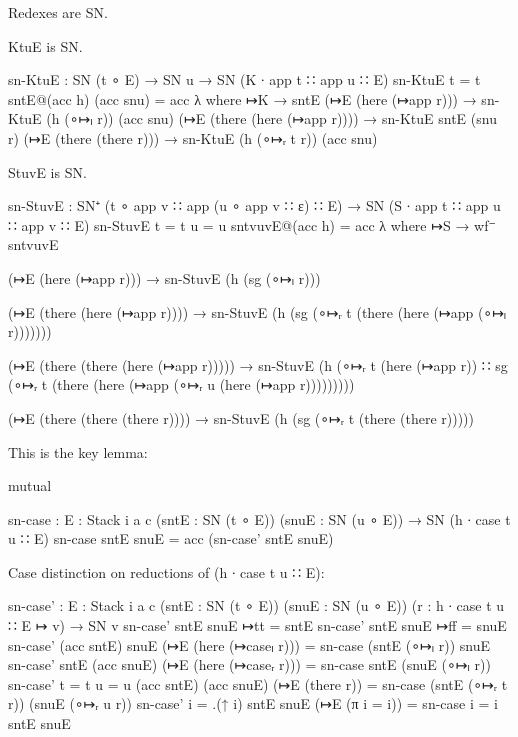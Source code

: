 Redexes are SN.

KtuE is SN.

\begin{code}
sn-KtuE : SN (t ∘ E) → SN u → SN (K ∙ app t ∷ app u ∷ E)
sn-KtuE {t = t} sntE@(acc h) (acc snu)  = acc λ where
   ↦K                            → sntE
   (↦E (here (↦app r)))          → sn-KtuE (h (∘↦ₗ r))    (acc snu)
   (↦E (there (here (↦app r))))  → sn-KtuE sntE           (snu r)
   (↦E (there (there r)))        → sn-KtuE (h (∘↦ᵣ t r))  (acc snu)
\end{code}

StuvE is SN.

\begin{code}
sn-StuvE : SN⁺ (t ∘ app v ∷ app (u ∘ app v ∷ ε) ∷ E)
          → SN (S ∙ app t ∷ app u ∷ app v ∷ E)
sn-StuvE {t = t} {u = u} sntvuvE@(acc h) = acc λ where
  ↦S →
    wf⁻ sntvuvE

  (↦E (here (↦app r))) →
    sn-StuvE (h (sg (∘↦ₗ r)))

  (↦E (there (here (↦app r)))) →
    sn-StuvE (h (sg (∘↦ᵣ t (there (here (↦app (∘↦ₗ r)))))))

  (↦E (there (there (here (↦app r))))) →
    sn-StuvE (h (∘↦ᵣ t (here (↦app r)) ∷
                 sg (∘↦ᵣ t (there (here (↦app (∘↦ᵣ u (here (↦app r)))))))))

  (↦E (there (there (there r)))) →
    sn-StuvE (h (sg (∘↦ᵣ t (there (there r)))))
\end{code}

This is the key lemma:

\begin{code}
mutual

  sn-case : {E : Stack i a c} (sntE : SN (t ∘ E)) (snuE : SN (u ∘ E)) → SN (h ∙ case t u ∷ E)
  sn-case sntE snuE = acc (sn-case' sntE snuE)
\end{code}

  Case distinction on reductions of (h ∙ case t u ∷ E):

\begin{code}
  sn-case' : {E : Stack i a c}
            (sntE : SN (t ∘ E))
            (snuE : SN (u ∘ E))
            (r : h ∙ case t u ∷ E ↦ v) → SN v
  sn-case'  sntE snuE ↦tt = sntE
  sn-case'  sntE snuE ↦ff = snuE
  sn-case'  (acc sntE) snuE (↦E (here (↦caseₗ r)))   = sn-case (sntE (∘↦ₗ r)) snuE
  sn-case'  sntE (acc snuE) (↦E (here (↦caseᵣ r)))   = sn-case sntE (snuE (∘↦ₗ r))
  sn-case'  {t = t} {u = u}
            (acc sntE) (acc snuE) (↦E (there r))     = sn-case (sntE (∘↦ᵣ t r)) (snuE (∘↦ᵣ u r))
  sn-case'  {i = .(↑ i)} sntE snuE (↦E (π {i = i}))  = sn-case {i = i} sntE snuE
\end{code}

